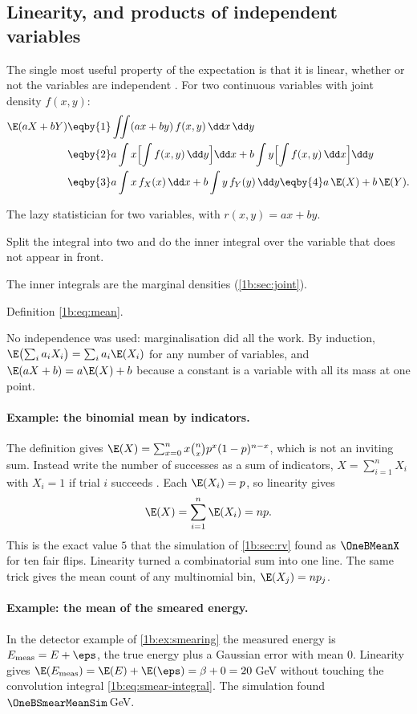\subsection{Linearity, and products of independent variables}

The single most useful property of the expectation is that it is linear,
whether or not the variables are independent . For
two continuous variables with joint density $f(x,y)$:
\begin{align*}
  \E(aX+bY)
  &\eqby{1} \iint(ax+by)\,f(x,y)\,\dd x\,\dd y\\
  &\eqby{2} a\int x\Bigl[\int f(x,y)\,\dd y\Bigr]\dd x
           +b\int y\Bigl[\int f(x,y)\,\dd x\Bigr]\dd y\\
  &\eqby{3} a\int x\,f_X(x)\,\dd x+b\int y\,f_Y(y)\,\dd y
   \eqby{4} a\,\E(X)+b\,\E(Y) .
\end{align*}
\begin{explain}
  \item The lazy statistician for two variables, with $r(x,y)=ax+by$.
  \item Split the integral into two and do the inner integral over the
        variable that does not appear in front.
  \item The inner integrals are the marginal densities (\cref{1b:sec:joint}).
  \item Definition \eqref{1b:eq:mean}.
\end{explain}
No independence was used: marginalisation did all the work. By induction,
$\E\bigl(\sum_ia_iX_i\bigr)=\sum_ia_i\E(X_i)$ for any number of variables, and
$\E(aX+b)=a\E(X)+b$ because a constant is a variable with all its mass at one
point.

\paragraph{Example: the binomial mean by indicators.}
The definition gives $\E(X)=\sum_{x=0}^nx\binom nxp^x(1-p)^{n-x}$, which is
not an inviting sum. Instead write the number of successes as a sum of
indicators, $X=\sum_{i=1}^nX_i$ with $X_i=1$ if trial $i$ succeeds
. Each $\E(X_i)=p$, so linearity gives
\[
  \E(X)=\sum_{i=1}^n\E(X_i)=np .
\]
This is the exact value $5$ that the simulation of \cref{1b:sec:rv} found as
$\OneBMeanX$ for ten fair flips. Linearity turned a combinatorial sum into one
line. The same trick gives the mean count of any multinomial bin,
$\E(X_j)=np_j$.

\paragraph{Example: the mean of the smeared energy.}
In the detector example of \cref{1b:ex:smearing} the measured energy is
$E_{\rm meas}=E+\eps$, the true energy plus a Gaussian error with mean $0$.
Linearity gives $\E(E_{\rm meas})=\E(E)+\E(\eps)=\beta+0=20\,$GeV without
touching the convolution integral \eqref{1b:eq:smear-integral}. The
simulation found $\OneBSmearMeanSim\,$GeV.

